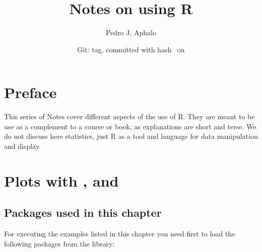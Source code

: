 \documentclass[paper=a4,10pt,div=17,headsepline,BCOR=12mm,twoside,open=right]{scrbook}\usepackage{knitr}
\title{Notes on using R}
\author{Pedro J. Aphalo}
\date{Git: tag\gitVtagn , committed with hash \gitAbbrevHash\ on \gitAuthorIsoDate}
\begin{document}











\maketitle


\tableofcontents




\chapter*{Preface}

This series of Notes cover different aspects of the use of R. They are meant to be use as a complement to a course or book, as explanations
are short and terse. We do not discuss here statistics, just R as a tool and language for data manipulation and display.













\chapter[Plots with ggpplot, ggrepel and ggpmisc]{Plots with \ggplot, \ggrepel and \ggpmisc}\label{chap:R:plotting}

\section{Packages used in this chapter}

For executing the examples listed in this chapter you need first to load the following packages from the library:
\end{document}
